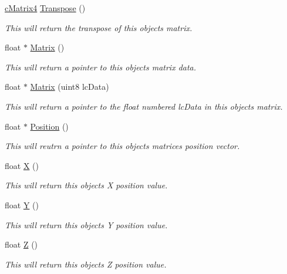 \begin{DoxyCompactItemize}
\hyperlink{classc_matrix4}{cMatrix4} \hyperlink{classc_matrix4_ac8b6f1a9352943cd86ef4c088c438307}{Transpose} ()
\begin{DoxyCompactList}\small\item\em This will return the transpose of this objects matrix. \item\end{DoxyCompactList}\item 
float $\ast$ \hyperlink{classc_matrix4_a8697973a28e45b0866cce4cdba2e216d}{Matrix} ()
\begin{DoxyCompactList}\small\item\em This will return a pointer to this objects matrix data. \item\end{DoxyCompactList}\item 
float $\ast$ \hyperlink{classc_matrix4_a1e70788aed256a22cf62b11a12e0db74}{Matrix} (uint8 lcData)
\begin{DoxyCompactList}\small\item\em This will return a pointer to the float numbered lcData in this objects matrix. \item\end{DoxyCompactList}\item 
float $\ast$ \hyperlink{classc_matrix4_a7b0917b0f0a69d73ed41d05fd37d52ac}{Position} ()
\begin{DoxyCompactList}\small\item\em This will reutrn a pointer to this objects matrices position vector. \item\end{DoxyCompactList}\item 
float \hyperlink{classc_matrix4_aff5d7d1cf3cf0b9ddb9e55e2f799012f}{X} ()
\begin{DoxyCompactList}\small\item\em This will return this objects X position value. \item\end{DoxyCompactList}\item 
float \hyperlink{classc_matrix4_aa22f36646d19566a438a297cb9a9bfb5}{Y} ()
\begin{DoxyCompactList}\small\item\em This will return this objects Y position value. \item\end{DoxyCompactList}\item 
float \hyperlink{classc_matrix4_a8b62f500f8194b06dab12e85e57fd9ef}{Z} ()
\begin{DoxyCompactList}\small\item\em This will return this objects Z position value. \item\end{DoxyCompactList}\item 

\end{DoxyCompactItemize}
